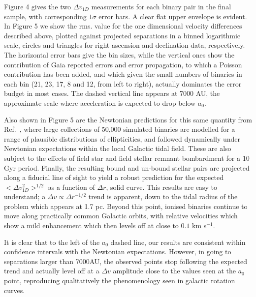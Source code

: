 \documentclass{ws-ijmpd}
\begin{document}
Figure 4 gives the two $\Delta v_{1D}$ measurements for each binary pair in the final sample, with corresponding $1\sigma$
error bars. A clear flat upper envelope is evident. In Figure 5 we show the rms. value for the one dimensional velocity
differences described above, plotted against projected separations in a binned logarithmic scale, circles and triangles for
right ascension and declination data, respectively. The horizontal error bars give the bin sizes, while the vertical ones
show the contribution of Gaia reported errors and error propagation, to which a Poisson contribution has been added, and
which given the small numbers of binaries in each bin (21, 23, 17, 8 and 12, from left to right), actually dominates the
error budget in most cases. The dashed vertical line appears at 7000 AU, the approximate scale where acceleration is expected
to drop below $a_{0}$.



Also shown in Figure 5 are the Newtonian predictions for this same quantity from Ref.~, where large
collections of 50,000 simulated binaries are modelled for a range of plausible distributions of ellipticities, and
followed dynamically under Newtonian expectations within the local Galactic tidal field. These are also subject to the effects of
field star and field stellar remnant bombardment for a 10 Gyr period. Finally, the resulting bound and un-bound stellar
pairs are projected along a fiducial line of sight to yield a robust prediction for the expected $<\Delta v^{2}_{1D}>^{1/2}$
as a function of $\Delta r$, solid curve. This results are easy to understand; a $\Delta v \propto \Delta r^{-1/2}$ trend
is apparent, down to the tidal radius of the problem which appears at 1.7 pc. Beyond this point, ionised binaries
continue to move along practically common Galactic orbits, with relative velocities which show a mild enhancement which
then levels off at close to $0.1$ km s$^{-1}$.

It is clear that to the left of the $a_{0}$ dashed line, our results are consistent within confidence intervals with the
Newtonian expectations. However, in going to separations larger than 7000AU, the observed points stop following the expected
trend and actually level off at a $\Delta v$ amplitude close to the values seen at the $a_{0}$ point, reproducing qualitatively
the phenomenology seen in galactic rotation curves.
\end{document}
